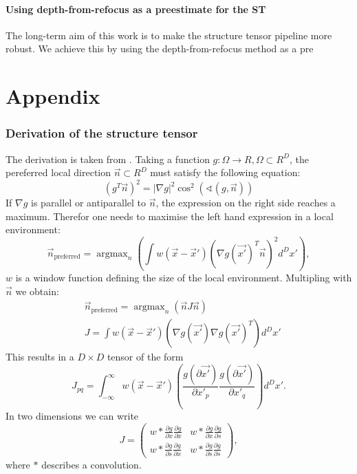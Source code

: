 \documentclass  [
  paper    = a4,
  BCOR     = 10mm,
  twoside,
  fontsize = 12pt,
  fleqn,
  toc      = bibnumbered,
  toc      = listofnumbered,
  numbers  = noendperiod,
  headings = normal,
  listof   = leveldown,
  version  = 3.03
]                                       {scrreprt}
\DeclareMathOperator*{\argmax}{argmax}
\begin{document}
\begin{description}
	
	
	
	\subsection{Using depth-from-refocus as a preestimate for the ST}
	The long-term aim of this work is to make the structure tensor pipeline more robust. We achieve this by using the depth-from-refocus method as a pre
\end{description}

  \part{Appendix}
  \begin{appendix}
  	\section{Derivation of the structure tensor}
  	The derivation is taken from \cite{jahne2013digitale}. Taking a function $g:\Omega\rightarrow \!R, \Omega \subset \!R^D$, the pereferred local direction $\vec{n} \subset \!R^D$ must satisfy the following equation:
  	\begin{equation}\label{key}
  	( g^T\vec{n})^2 = |\nabla g |^2 \cos^2(\sphericalangle (g, \vec{n}))
  	\end{equation}
  	If $\nabla g$ is parallel or antiparallel to $\vec{n}$, the expression on the right side reaches a maximum. Therefor one needs to maximise the left hand expression in a local environment:
  	\begin{equation}\label{key}
  	\vec n_\text{preferred} = \argmax_n\left(\int w(\vec x - \vec x')\left(\nabla g(\vec{x'})^T \vec{n}\right)^2d^Dx' \right),
  	\end{equation}
  	$w$ is a window function defining the size of the local environment. Multipling with $\vec{n}$
  	we obtain:
  	\begin{align}\label{key}
  	&\vec n_\text{preferred} = \argmax_n\left(\vec n  J \vec n \right)\\
  	& J = \int w(\vec x - \vec x')\left(\nabla g(\vec{x'}) \nabla g(\vec{x'})^T\right)d^Dx'
  	\end{align}
  	This results in a $D\times D $ tensor of the form
  	\begin{equation}\label{key}
  	J_{pq} = \int_{-\infty}^{\infty} w(\vec x - \vec x')\left(\frac{g(\partial\vec{x'})}{\partial x'_p} \frac{g(\partial\vec{x'})}{\partial x'_q}\right)d^Dx'.
  	\end{equation}
  	In two dimensions we can write
	\begin{equation}\label{key}
	J =\left(
	\begin{matrix}
	w*\frac{\partial g}{\partial x}\frac{\partial g}{\partial x} & w*\frac{\partial g}{\partial x}\frac{\partial g}{\partial s} \\
	w*\frac{\partial g}{\partial s}\frac{\partial g}{\partial x} & w*\frac{\partial g}{\partial s}\frac{\partial g}{\partial s} 
	\end{matrix}\right),
	\end{equation}  
	where \glqq $*$ \grqq describes a convolution.	
  	

\end{appendix}
\end{document}
